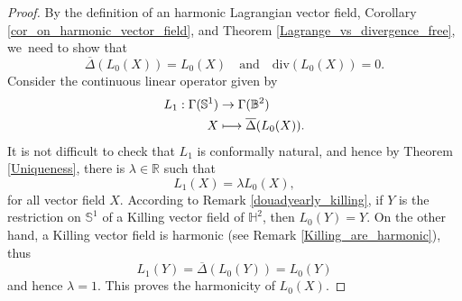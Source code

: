 \documentclass[11pt]{article}
\newcommand\mto{\mathchoice{\longmapsto}{\mapsto}{\mapsto}{\mapsto}}
\theoremstyle{plain}
\theoremstyle{definition}
\begin{document}
\begin{proof}
By the definition of an harmonic Lagrangian vector field, Corollary \ref{cor_on_harmonic_vector_field}, and Theorem \ref{Lagrange_vs_divergence_free}, we~need to show that \begin{equation}
\overline{\Delta}(L_0(X))=L_0(X) \quad\text{and}\quad \mathrm{div}(L_0(X))=0.
\end{equation}
Consider the continuous linear operator given by
\[
\begin{aligned}
L_1:\Gamma(\mathbb{S}^1) & \to \Gamma(\mathbb{B}^2) \\
X & \mto \overline{\Delta}(L_0(X)).
\end{aligned}
\]
It is not difficult to check that $L_1$ is conformally natural, and hence by Theorem \ref{Uniqueness}, there is $\lambda\in\mathbb{R}$ such that
\begin{equation}\label{eq_harmo_L0}
L_1(X)=\lambda L_0(X),
\end{equation} for all vector field $X$.
According to Remark \ref{douadyearly_killing}, if $Y$ is the restriction on $\mathbb{S}^1$ of a Killing vector field of $\mathbb{H}^2$, then $L_0(Y)=Y$. On the other hand, a Killing vector field is harmonic (see Remark \ref{Killing_are_harmonic}), thus
\[
L_1(Y)=\overline{\Delta}(L_0(Y))=L_0(Y)
\]
and hence $\lambda=1$. This proves the harmonicity of $L_0(X)$.


\end{proof}
\end{document}

